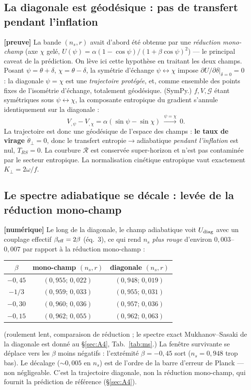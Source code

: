 \documentclass[11pt,a4paper]{article}
\newcommand{\st}[1]{\textbf{\textcolor{blue!45!black}{[#1]}}}
\begin{document}
\subsection{La diagonale est géodésique : pas de transfert pendant l'inflation}
\st{preuve} La bande $(n_s,r)$ avait d'abord été obtenue par une \emph{réduction mono-champ} (axe $\chi$ gelé, $U(\psi)=\alpha(1-\cos\psi)/(1+\beta\cos\psi)^2$) --- le principal caveat de la prédiction. On lève ici cette hypothèse en traitant les deux champs. Posant $\psi=\theta+\delta$, $\chi=\theta-\delta$, la symétrie d'échange $\psi\leftrightarrow\chi$ impose $\partial U/\partial\delta|_{\delta=0}=0$ : la diagonale $\psi=\chi$ est une \emph{trajectoire protégée}, et, comme ensemble des points fixes de l'isométrie d'échange, totalement géodésique. (SymPy.) $f,V,\mathcal{G}$ étant symétriques sous $\psi\leftrightarrow\chi$, la composante entropique du gradient s'annule identiquement sur la diagonale :
\begin{equation}
V_{,\psi}-V_{,\chi}=\alpha(\sin\psi-\sin\chi)\ \xrightarrow{\psi=\chi}\ 0. \tag{7}
\end{equation}
La trajectoire est donc une géodésique de l'espace des champs : \textbf{le taux de virage $\dot\theta_\perp=0$}, donc le transfert entropie$\to$adiabatique \emph{pendant l'inflation} est nul, $T_{RS}=0$. La courbure $\mathcal{R}$ est conservée super-horizon et n'est pas contaminée par le secteur entropique. La normalisation cinétique entropique vaut exactement $K_\perp=2\omega/f$.

\subsection{Le spectre adiabatique se décale : levée de la réduction mono-champ}
\st{numérique} Le long de la diagonale, le champ adiabatique voit $U_{\rm diag}$ avec un couplage effectif $\beta_{\rm eff}=2\beta$ (éq.~3), ce qui rend $n_s$ \emph{plus rouge} d'environ $0{,}003$–$0{,}007$ par rapport à la réduction mono-champ :
\begin{center}\small
\begin{tabular}{ccc}
\toprule
$\beta$ & mono-champ $(n_s,r)$ & diagonale $(n_s,r)$ \\
\midrule
$-0{,}45$ & $(0{,}955;\,0{,}022)$ & $(0{,}948;\,0{,}019)$ \\
$-1/3$    & $(0{,}959;\,0{,}033)$ & $(0{,}955;\,0{,}031)$ \\
$-0{,}30$ & $(0{,}960;\,0{,}036)$ & $(0{,}957;\,0{,}036)$ \\
$-0{,}15$ & $(0{,}962;\,0{,}055)$ & $(0{,}962;\,0{,}063)$ \\
\bottomrule
\end{tabular}
\end{center}
(roulement lent, comparaison de réduction ; le spectre exact Mukhanov–Sasaki de la diagonale est donné au \S\ref{sec:A4}, Tab.~\ref{tab:ms}.) La fenêtre survivante se déplace vers les $\beta$ moins négatifs : l'extrémité $\beta=-0{,}45$ sort ($n_s=0{,}948$ trop bas). Le décalage ($\sim0{,}005$ en $n_s$) est de l'ordre de la barre d'erreur de Planck --- non négligeable. C'est la trajectoire diagonale, non la réduction mono-champ, qui fournit la prédiction de référence (\S\ref{sec:A4}).
\end{document}
